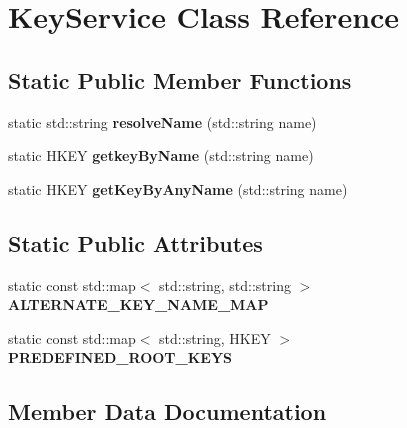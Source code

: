 \hypertarget{class_key_service}{}\section{Key\+Service Class Reference}
\label{class_key_service}
\subsection*{Static Public Member Functions}
\begin{DoxyCompactItemize}
\item 
\hypertarget{class_key_service_a805af87356befa87fe19820b952afdf6}{}static std\+::string {\bfseries resolve\+Name} (std\+::string name)\label{class_key_service_a805af87356befa87fe19820b952afdf6}

\item 
\hypertarget{class_key_service_ab8a39c0f99348ff255db17939d765700}{}static H\+K\+E\+Y {\bfseries getkey\+By\+Name} (std\+::string name)\label{class_key_service_ab8a39c0f99348ff255db17939d765700}

\item 
\hypertarget{class_key_service_ad936e7e6affaefd1a032574d2c5513f9}{}static H\+K\+E\+Y {\bfseries get\+Key\+By\+Any\+Name} (std\+::string name)\label{class_key_service_ad936e7e6affaefd1a032574d2c5513f9}

\end{DoxyCompactItemize}
\subsection*{Static Public Attributes}
\begin{DoxyCompactItemize}
\item 
static const std\+::map$<$ std\+::string, std\+::string $>$ {\bfseries A\+L\+T\+E\+R\+N\+A\+T\+E\+\_\+\+K\+E\+Y\+\_\+\+N\+A\+M\+E\+\_\+\+M\+A\+P}
\item 
static const std\+::map$<$ std\+::string, H\+K\+E\+Y $>$ {\bfseries P\+R\+E\+D\+E\+F\+I\+N\+E\+D\+\_\+\+R\+O\+O\+T\+\_\+\+K\+E\+Y\+S}
\end{DoxyCompactItemize}


\subsection{Member Data Documentation}
\hypertarget{class_key_service_a142ce8aec67304045a1151e6ac8429a1}{}

